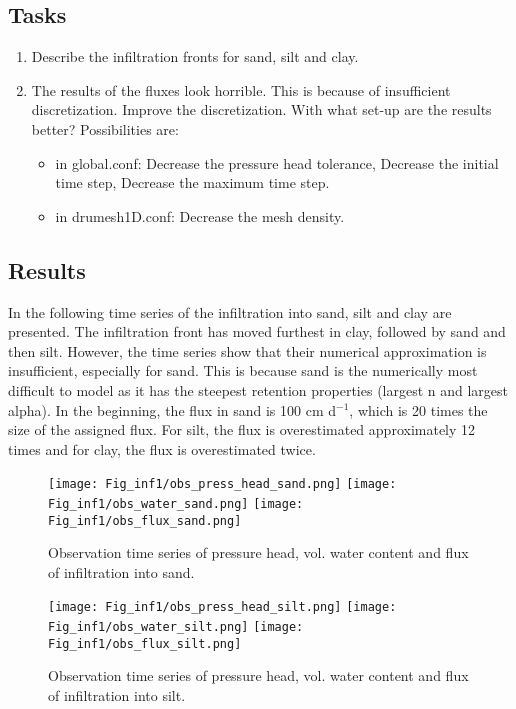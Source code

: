 \subsection*{Tasks}

\begin{enumerate}
\item Describe the infiltration fronts for sand, silt and clay.
\item The results of the fluxes look horrible. This is because of insufficient discretization. Improve the discretization. With what set-up are the results better? Possibilities are: 
\begin{itemize}
\item in global.conf: Decrease the pressure head tolerance, Decrease the initial time step, Decrease the maximum time step.
\item in drumesh1D.conf: Decrease the mesh density. 
\end{itemize}
\end{enumerate}



\subsection*{Results}
In the following time series of the infiltration into sand, silt and clay are presented. The infiltration front has moved furthest in clay, followed by sand and then silt. However, the time series show that their numerical approximation is insufficient, especially for sand. This is because sand is the numerically most difficult to model as it has the steepest retention properties (largest n and largest alpha). In the beginning, the flux in sand is 100 cm d$^{-1}$, which is 20 times the size of the assigned flux. For silt, the flux is overestimated approximately 12 times and for clay, the flux is overestimated twice. 

\begin{figure}
\centering
\texttt{[image: Fig\_inf1/obs\_press\_head\_sand.png]}
\texttt{[image: Fig\_inf1/obs\_water\_sand.png]}
\texttt{[image: Fig\_inf1/obs\_flux\_sand.png]}
\caption{Observation time series of pressure head, vol. water content and flux of infiltration into sand.}
\end{figure}

\begin{figure}
\centering
\texttt{[image: Fig\_inf1/obs\_press\_head\_silt.png]}
\texttt{[image: Fig\_inf1/obs\_water\_silt.png]}
\texttt{[image: Fig\_inf1/obs\_flux\_silt.png]}
\caption{Observation time series of pressure head, vol. water content and flux of infiltration into silt.}

\end{figure}


